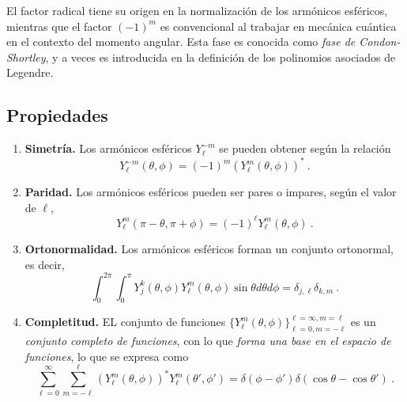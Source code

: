 El factor radical tiene su origen en la normalización de los armónicos esféricos, mientras que el factor $(-1)^m$ es convencional al trabajar en mecánica cuántica en el contexto del momento angular. Esta fase es conocida como \emph{fase de Condon-Shortley}, y a veces es introducida en la definición de los polinomios asociados de Legendre.

\subsection{Propiedades}

\begin{enumerate}
    \item \textbf{Simetría.} Los armónicos esféricos $Y_\ell^{-m}$ se pueden obtener según la relación
    \begin{equation}
        Y_\ell^{-m}(\theta, \phi) = (-1)^m (Y_\ell^m (\theta, \phi))^\ast \ .
    \end{equation}

    \item \textbf{Paridad.} Los armónicos esféricos pueden ser pares o impares, según el valor de $\ell$,
    \begin{equation}
        Y_\ell^m(\pi - \theta, \pi + \phi) = (-1)^\ell Y_\ell^m(\theta, \phi) \ .
    \end{equation}

    \item \textbf{Ortonormalidad.} Los armónicos esféricos forman un conjunto ortonormal, es decir,
    \begin{equation}
        \int_0^{2\pi} \int_0^\pi Y_j^k(\theta, \phi) Y_\ell^m (\theta, \phi) \sin\theta d\theta d\phi = \delta_{j, \ell} \delta_{k, m} \ .
    \end{equation}

    \item \textbf{Completitud.} EL conjunto de funciones $\{ Y_\ell^m(\theta, \phi) \}_{\ell = 0, m = -\ell}^{\ell = \infty, m = \ell}$ es un \emph{conjunto completo de funciones}, con lo que \emph{forma una base en el espacio de funciones}, lo que se expresa como
    \begin{equation}
        \sum_{\ell = 0}^{\infty} \sum_{m = -\ell}^{\ell} (Y_\ell^m (\theta, \phi))^\ast Y_{\ell}^m (\theta', \phi') = \delta(\phi - \phi') \delta(\cos\theta - \cos\theta') \ .
    \end{equation}
    

\end{enumerate}

